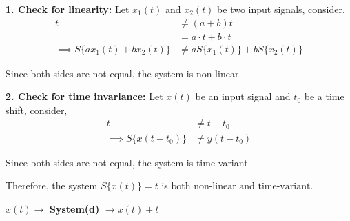 \documentclass[a4paper, 10pt]{article}
\begin{document}
\begin{solution}
\vspace{2mm}

\par\noindent\textbf{1. Check for linearity:}
Let \( x_1(t) \) and \( x_2(t) \) be two input signals, consider,
\begin{align*}
t &\neq (a + b)t \\
&= a \cdot t + b \cdot t \\
\implies S\{ a x_1(t) + b x_2(t) \} &\neq a S\{ x_1(t) \} + b S\{ x_2(t) \}
\end{align*}

Since both sides are not equal, the system is non-linear.

\vspace{2mm}

\par\noindent\textbf{2. Check for time invariance:}
Let \( x(t) \) be an input signal and \( t_0 \) be a time shift, consider,
\begin{align*}
t &\neq t - t_0 \\
\implies S\{ x(t - t_0) \} &\neq y(t - t_0)
\end{align*}

Since both sides are not equal, the system is time-variant.

Therefore, the system \( S\{ x(t) \} = t \) is \( \boxed{\text{both non-linear and time-variant}} \).
\end{solution}


\begin{subproblems}[start=4]
    \item \( x(t) \rightarrow \) \textbf{System(d)} \( \rightarrow x(t)+t \)
\end{subproblems}
\end{document}

